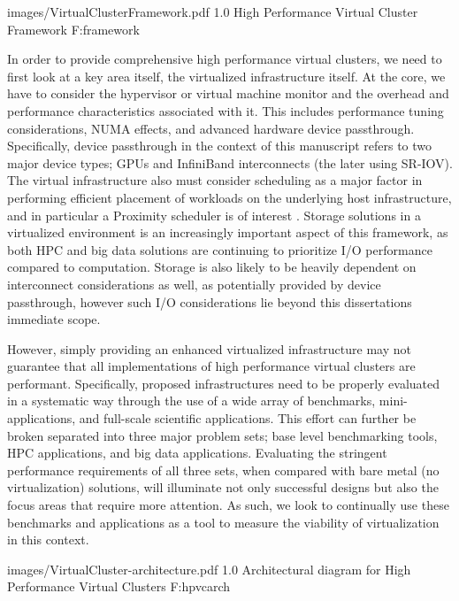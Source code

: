   {images/VirtualClusterFramework.pdf}
  {1.0}
  {High Performance Virtual Cluster Framework}
  {F:framework}

In order to provide comprehensive high performance virtual clusters, we need to first look at a key area itself, the virtualized infrastructure itself. At the core, we have to consider the hypervisor or virtual machine monitor and the overhead and performance characteristics associated with it. This includes performance tuning considerations, NUMA effects, and advanced hardware device passthrough. Specifically, device passthrough in the context of this manuscript refers to two major device types; GPUs and InfiniBand interconnects (the later using SR-IOV). The virtual infrastructure also must consider scheduling as a major factor in performing efficient placement of workloads on the underlying host infrastructure, and in particular a Proximity scheduler is of interest \cite{www-proximity-scheduler}. Storage solutions in a virtualized environment is an increasingly important aspect of this framework, as both HPC and big data solutions are continuing to prioritize I/O performance compared to computation. Storage is also likely to be heavily dependent on interconnect considerations as well, as potentially provided by device passthrough, however such I/O considerations lie beyond this dissertations immediate scope.  

However, simply providing an enhanced virtualized infrastructure may not guarantee that all implementations of high performance virtual clusters are performant. Specifically, proposed infrastructures need to be properly evaluated in a systematic way through the use of a wide array of benchmarks, mini-applications, and full-scale scientific applications. This effort can further be broken separated into three major problem sets; base level benchmarking tools, HPC applications, and big data applications. Evaluating the stringent performance requirements of all three sets, when compared with bare metal (no virtualization) solutions, will illuminate not only successful designs but also the focus areas that require more attention.  As such, we look to continually use these benchmarks and applications as a tool to measure the viability of virtualization in this context. 

  {images/VirtualCluster-architecture.pdf}
  {1.0}
  {Architectural diagram for High Performance Virtual Clusters}
  {F:hpvcarch}

